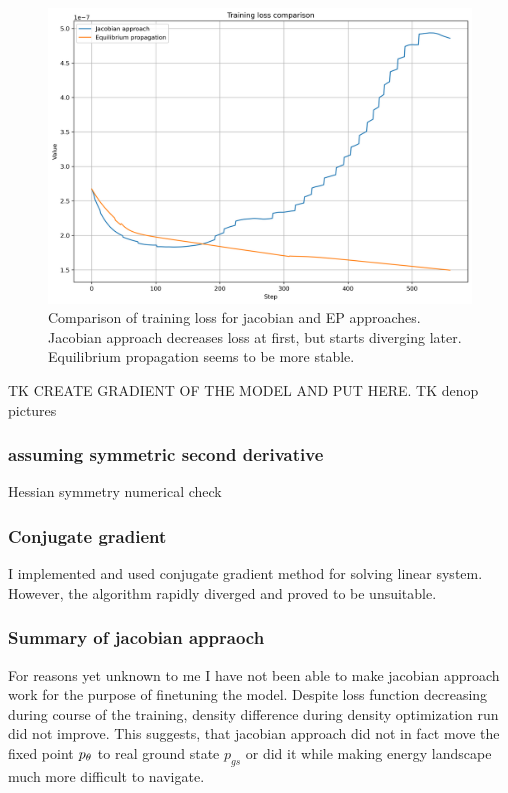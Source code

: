 \documentclass[a4paper,10pt]{report}
\begin{document}
\begin{figure}[h!]
 \centering
 \includegraphics[scale=0.5]{images/loss_comparison.png}
 \caption{Comparison of training loss for jacobian and EP approaches. Jacobian approach decreases loss at first, but starts diverging later. Equilibrium propagation seems to be more stable.}
 \label{fig:jac-eqprop-loss}
\end{figure}



 TK CREATE GRADIENT OF THE MODEL AND PUT HERE.
TK denop pictures
\subsubsection{assuming symmetric second derivative}

Hessian symmetry numerical check

\subsubsection{Conjugate gradient}
I implemented and used conjugate gradient method for solving linear system. However, the algorithm rapidly diverged and proved to be unsuitable.
\subsubsection{Summary of jacobian appraoch}

 For reasons yet unknown to me I have not been able to make jacobian approach work for the purpose of finetuning the model. Despite loss function decreasing during course of the training, density difference during density optimization run did not improve. This suggests, that jacobian approach did not in fact move the fixed point $p_\theta$ to real ground state $p_{gs}$ or did it while making energy landscape much more difficult to navigate.
\end{document}
